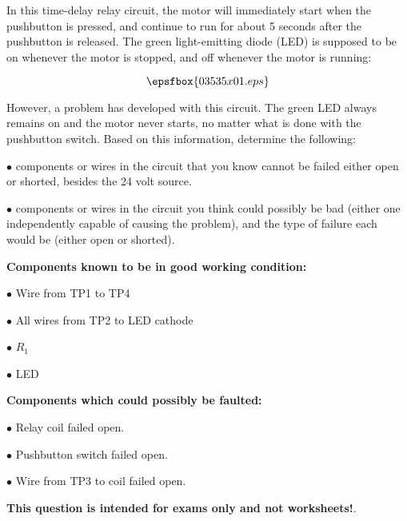 

In this time-delay relay circuit, the motor will immediately start when the pushbutton is pressed, and continue to run for about 5 seconds after the pushbutton is released.  The green light-emitting diode (LED) is supposed to be on whenever the motor is stopped, and off whenever the motor is running:

$$\epsfbox{03535x01.eps}$$

However, a problem has developed with this circuit.  The green LED always remains on and the motor never starts, no matter what is done with the pushbutton switch.  Based on this information, determine the following:

\vskip 10pt

\medskip
\item{$\bullet$}  components or wires in the circuit that you know cannot be failed either open or shorted, besides the 24 volt source.
\vskip 40pt
\item{$\bullet$}  components or wires in the circuit you think could possibly be bad (either one independently capable of causing the problem), and the type of failure each would be (either open or shorted).
\medskip







\goodbreak
\noindent
{\bf Components known to be in good working condition:}

\medskip
\item{$\bullet$} Wire from TP1 to TP4
\item{$\bullet$} All wires from TP2 to LED cathode
\item{$\bullet$} $R_1$
\item{$\bullet$} LED
\medskip

\vskip 10pt

\goodbreak
\noindent
{\bf Components which could possibly be faulted:}

\medskip
\item{$\bullet$} Relay coil failed open.
\item{$\bullet$} Pushbutton switch failed open.
\item{$\bullet$} Wire from TP3 to coil failed open.
\medskip







{\bf This question is intended for exams only and not worksheets!}.



